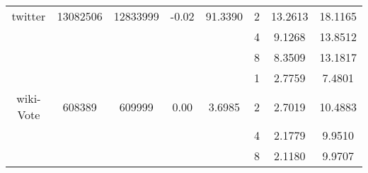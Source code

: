 \documentclass[11pt]{report}
\begin{document}
\begin{table}[t]
{\begin{tabular}{@{}c|c|c|c|c|c|c|c}
twitter & 13082506 & 12833999 & -0.02 & 91.3390 & 2 & 13.2613 & 18.1165 \\
& & & & & 4 & 9.1268 & 13.8512 \\
& & & & & 8 & 8.3509 & 13.1817 \\
\hline
& & & & & 1 & 2.7759 & 7.4801 \\
wiki-Vote & 608389 & 609999 & 0.00 & 3.6985 & 2 & 2.7019 & 10.4883 \\
& & & & & 4 & 2.1779 & 9.9510 \\
& & & & & 8 & 2.1180 & 9.9707 \\
\hline
\hline
\end{tabular}
}
\end{table}
\end{document}
